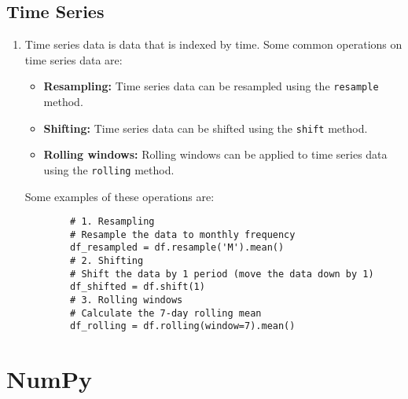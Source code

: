 \documentclass[letterpaper, 11pt]{article}
\newcommand{\1}{\mathds{1}}	%
\theoremstyle{definition}
\begin{document}
\subsection{Time Series}
\begin{enumerate}
    \item Time series data is data that is indexed by time. Some common operations on time series data are:
    \begin{itemize}
        \item \textbf{Resampling:} Time series data can be resampled using the \texttt{resample} method.
        \item \textbf{Shifting:} Time series data can be shifted using the \texttt{shift} method.
        \item \textbf{Rolling windows:} Rolling windows can be applied to time series data using the \texttt{rolling} method.
    \end{itemize}
    Some examples of these operations are:
    \begin{verbatim}
        # 1. Resampling
        # Resample the data to monthly frequency
        df_resampled = df.resample('M').mean()
        # 2. Shifting
        # Shift the data by 1 period (move the data down by 1)
        df_shifted = df.shift(1)
        # 3. Rolling windows
        # Calculate the 7-day rolling mean
        df_rolling = df.rolling(window=7).mean()
    \end{verbatim}
    
\end{enumerate}

\section{NumPy}
\end{document}
